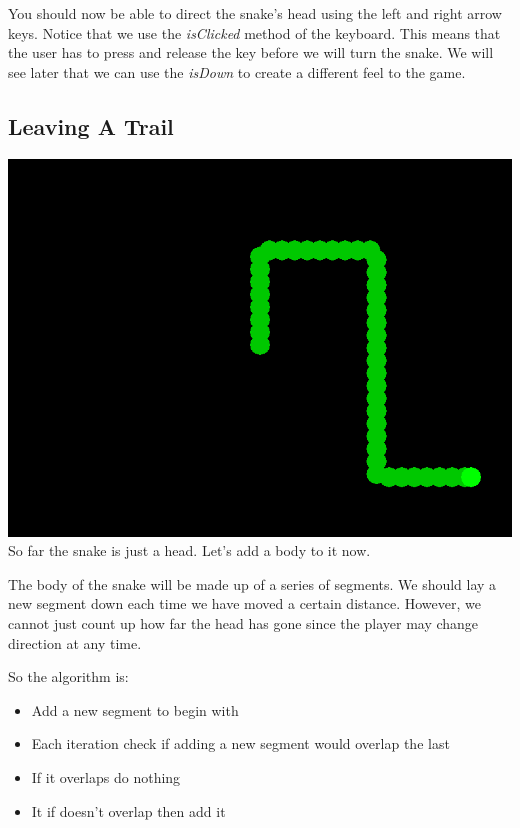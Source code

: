 \documentclass[letterpaper,10pt,english]{sphinxmanual}
\begin{document}
You should now be able to direct the snake's head using the left and right arrow keys.
Notice that we use the \emph{isClicked} method of the keyboard. This means that the user has
to press and release the key before we will turn the snake. We will see later that
we can use the \emph{isDown} to create a different feel to the game.


\subsection{Leaving A Trail}
\label{tutorial-1:leaving-a-trail}\includegraphics{ss-1-tail.png}
So far the snake is just a head. Let's add a body to it now.

The body of the snake will be made up of a series of segments. We should lay a new
segment down each time we have moved a certain distance. However, we cannot just count
up how far the head has gone since the player may change direction at any time.

So the algorithm is:
\begin{itemize}
\item {} 
Add a new segment to begin with

\item {} 
Each iteration check if adding a new segment would overlap the last

\item {} 
If it overlaps do nothing

\item {} 
It if doesn't overlap then add it

\end{itemize}
\end{document}
